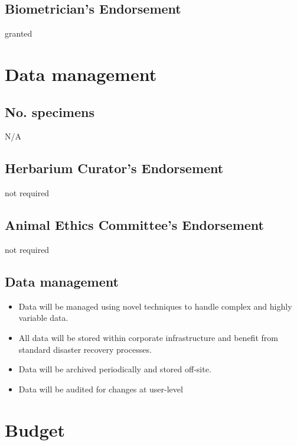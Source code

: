 \documentclass[version=last,
    paper=a4,                               %
    10pt,                                   %
    dvipsnames,
    oneside,                              %
    headings=openany,                       %
    open=any,
    BCOR=7mm,                               %
    DIV=15,     %
]{scrbook}
\begin{document}
\subsection*{Biometrician's Endorsement}

granted



\section*{Data management}


\subsection*{No. specimens}

N/A




\subsection*{Herbarium Curator's Endorsement}

not required




\subsection*{Animal Ethics Committee's Endorsement}

not required




\subsection*{Data management}

\begin{itemize}
\itemsep1pt\parskip0pt
\item
  Data will be managed using novel techniques to handle complex and
  highly variable data.
\item
  All data will be stored within corporate infrastructure and benefit
  from standard disaster recovery processes.
\item
  Data will be archived periodically and stored off-site.
\item
  Data will be audited for changes at user-level
\end{itemize}




\section*{Budget}
\end{document}
